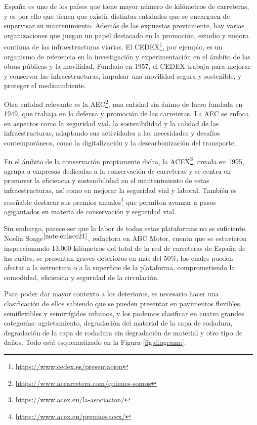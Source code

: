España es uno de los países que tiene mayor número de kilómetros de carreteras, y es por ello que tienen que existir distintas entidades que se encarguen de supervisar su mantenimiento. Además de las expuestas previamente, hay varias organizaciones que juegan un papel destacado en la promoción, estudio y mejora continua de las infraestructuras viarias. El \ac{CEDEX}\footnote{\url{https://www.cedex.es/presentacion}}, por ejemplo, es un organismo de referencia en la investigación y experimentación en el ámbito de las obras públicas y la movilidad. Fundado en 1957, el \acs{CEDEX} trabaja para mejorar y conservar las infraestructuras, impulsar una movilidad segura y sostenible, y proteger el medioambiente.

Otra entidad relevante es la \ac{AEC}\footnote{\url{https://www.aecarretera.com/quienes-somos}}, una entidad sin ánimo de lucro fundada en 1949, que trabaja en la defensa y promoción de las carreteras. La \acs{AEC} se enfoca en aspectos como la seguridad vial, la sostenibilidad y la calidad de las infraestructuras, adaptando sus actividades a las necesidades y desafíos contemporáneos, como la digitalización y la descarbonización del transporte.

En el ámbito de la conservación propiamente dicha, la \ac{ACEX}\footnote{\url{https://www.acex.eu/la-asociacion/}}, creada en 1995, agrupa a empresas dedicadas a la conservación de carreteras y se centra en promover la eficiencia y sostenibilidad en el mantenimiento de estas infraestructuras, así como en mejorar la seguridad vial y laboral. También es reseñable destacar sus premios anuales\footnote{\url{https://www.acex.eu/premios-acex/}} que permiten avanzar a pasos agigantados en materia de conservación y seguridad vial.


Sin embargo, parece ser que la labor de todas estas plataformas no es suficiente. Noelia Soage$^{\ref{note:enlace21}}$, redactora en ABC Motor, cuenta que se estuvieron inspeccionando 13.000 kilómetros del total de la red de carreteras de España de las cuáles, se presentan graves deterioros en más del 50\%; los cuales pueden afectar a la estructura o a la superficie de la plataforma, comprometiendo la comodidad, eficiencia y seguridad de la circulación.


Para poder dar mayor contexto a los deterioros, es necesario hacer una clasificación de ellos sabiendo que se pueden presentar en pavimentos flexibles, semiflexibles y semirrígidos urbanos, y los podemos clasificar en cuatro grandes categorías: agrietamiento, degradación del material de la capa de rodadura, degradación de la capa de rodadura sin degradación de material y otro tipo de daños. Todo está esquematizado en la Figura \ref{fig:diagrama}.

